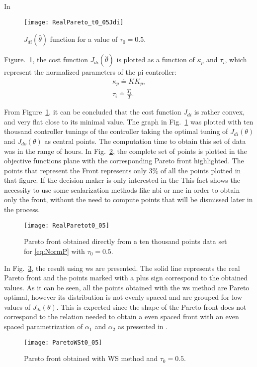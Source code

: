 In %
\begin{figure}[tb]%
	\centering
	\texttt{[image: RealPareto\_t0\_05Jdi]}%
	\caption{$J_{di}(\hat{\theta})$ function for a value of $\tau_0=0.5$.}%
	\label{fig:RealPareto_t0_05Jdi}%
\end{figure}
%
%
Figure.~\ref{fig:RealPareto_t0_05Jdi}, the cost function $J_{di}(\hat{\theta})$ is plotted as a function of $\kappa_p$ and $\tau_i$, which represent the normalized parameters of the \gls{pi} controller:
\begin{equation}
\begin{array}{c}
\kappa_p \doteq K K_p,\\
\tau_i \doteq \frac{T_i}{T}.
\end{array}
\label{eq:NormContrParam}
\end{equation}

From Figure~\ref{fig:RealPareto_t0_05Jdi}, it can be concluded that the cost function $J_{di}$ is rather convex, and very flat close to its minimal value. The graph in Fig.~\ref{fig:RealPareto_t0_05Jdi} was plotted with ten thousand controller tunings of the controller taking the optimal tuning of $J_{di}(\theta)$ and $J_{do}(\theta)$ as central points. The computation time to obtain this set of data was in the range of hours. In Fig.~\ref{fig:RealParetot0_05}, the complete set of points is plotted in the objective functions plane with the corresponding Pareto front highlighted. The points that represent the Front represents only 3\% of all the points plotted in that figure. If the decision maker is only interested in the  This fact shows the necessity to use some scalarization methods like \gls{nbi} or \gls{nnc} in order to obtain only the front, without the need to compute points that will be dismissed later in the process.
%
\begin{figure}[tb]%
\centering
\texttt{[image: RealParetot0\_05]} %
\caption{Pareto front obtained directly from a ten thousand points data set for \eqref{eq:NormP} with $\tau_0=0.5$.}%
\label{fig:RealParetot0_05}%
\end{figure}

In Fig.~\ref{fig:ParetoWSt0_05}, the result using \gls{ws} are presented. The solid line represents the real Pareto front and the points marked with a plus sign correspond to the obtained values. As it can be seen, all the points obtained with the \gls{ws} method are Pareto optimal, however its distribution is not evenly spaced and are grouped for low values of $J_{di}(\theta)$. This is expected since the shape of the Pareto front does not correspond to the relation needed to obtain a even spaced front with an even spaced parametrization of $\alpha_1$ and $\alpha_2$ as presented in \cite{Das1997}.
%
\begin{figure}[tb]%
\centering
\texttt{[image: ParetoWSt0\_05]}%
\caption{Pareto front obtained with WS method and $\tau_0=0.5$.}%
\label{fig:ParetoWSt0_05}%
\end{figure}


